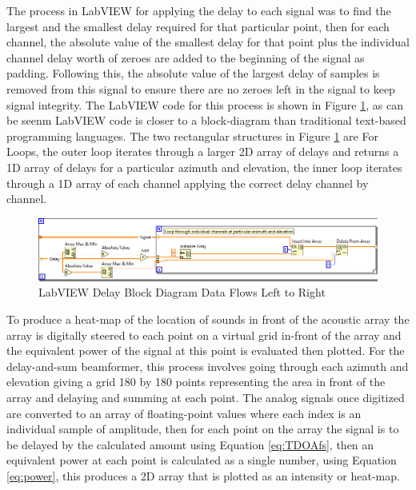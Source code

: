 \documentclass{UoNMCHA}
\numberwithin{equation}{section}
\begin{document}
    The process in LabVIEW for applying the delay to each signal was to find the largest and the smallest delay required for that particular point, then for each channel, the absolute value of the smallest delay for that point plus the individual channel delay worth of zeroes are added to the beginning of the signal as padding. Following this, the absolute value of the largest delay of samples is removed from this signal to ensure there are no zeroes left in the signal to keep signal integrity. The LabVIEW code for this process is shown in Figure \ref{fig:DelayLabVIEW}, as can be seenm LabVIEW code is closer to a block-diagram than traditional text-based programming languages. The two rectangular structures in Figure \ref{fig:DelayLabVIEW} are For Loops, the outer loop iterates through a larger 2D array of delays and returns a 1D array of delays for a particular azimuth and elevation, the inner loop iterates through a 1D array of each channel applying the correct delay channel by channel.
    
    \begin{figure} [H]
        \centering
        \includegraphics[keepaspectratio, width = \textwidth]{Figures/DelayBlockDiagram.png}
        \caption{LabVIEW Delay Block Diagram Data Flows Left to Right}
        \label{fig:DelayLabVIEW}
    \end{figure}
    
    To produce a heat-map of the location of sounds in front of the acoustic array the array is digitally steered to each point on a virtual grid in-front of the array and the equivalent power of the signal at this point is evaluated then plotted. For the delay-and-sum beamformer, this process involves going through each azimuth and elevation giving a grid 180 by 180 points representing the area in front of the array and delaying and summing at each point. The analog signals once digitized are converted to an array of floating-point values where each index is an individual sample of amplitude, then for each point on the array the signal is to be delayed by the calculated amount using Equation \ref{eq:TDOAfs}, then an equivalent power at each point is calculated as a single number, using Equation \ref{eq:power}, this produces a 2D array that is plotted as an intensity or heat-map.
   
\end{document}
